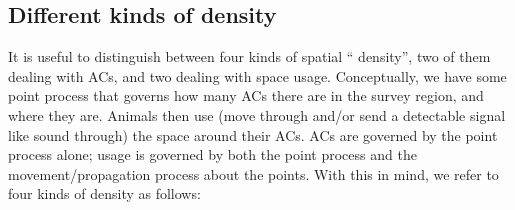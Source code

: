 \documentclass[10pt,a4paper]{article}
\begin{document}


\subsection{Different kinds of density}

It is useful to distinguish between four kinds of spatial `` density'', two of them dealing with ACs, and two dealing with space usage. Conceptually, we have some point process that governs how many ACs there are in the survey region, and where they are. Animals then use (move through and/or send a detectable signal like sound through) the space around their ACs. ACs are governed by the point process alone; usage is governed by both the point process and the movement/propagation process about the points. With this in mind, we refer to four kinds of density as follows:
\end{document}
